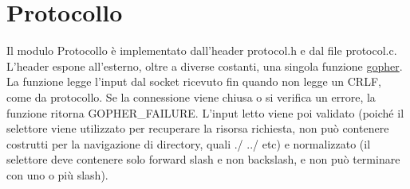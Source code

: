 \documentclass{article}
\begin{document}
\section{Protocollo}
Il modulo Protocollo è implementato dall'header protocol.h e dal file protocol.c.
L'header espone all'esterno, oltre a diverse costanti, una singola funzione \href{html/protocol_8h.html#a733e68cc8d5f947c30d0ca51e1b76d9b}{gopher}.
La funzione legge l'input dal socket ricevuto fin quando non legge un CRLF, come da protocollo.
Se la connessione viene chiusa o si verifica un errore, la funzione ritorna GOPHER\_FAILURE.
L'input letto viene poi validato (poiché il selettore viene utilizzato per recuperare la risorsa
richiesta, non può contenere costrutti per la navigazione di directory, quali ./ ../ etc) e normalizzato
(il selettore deve contenere solo forward slash e non backslash, e non può terminare con uno o più slash).
\end{document}

